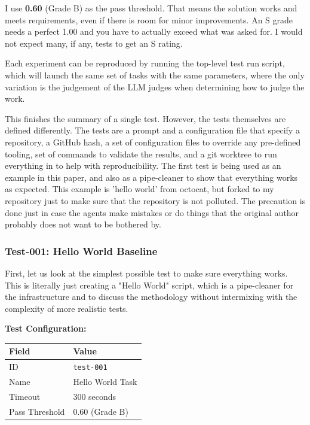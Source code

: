 \documentclass[11pt]{article}
\begin{document}
I use \textbf{0.60} (Grade B) as the pass threshold. That means the solution works
and meets requirements, even if there is room for minor improvements. An S grade
needs a perfect 1.00 and you have to actually exceed what was asked for. I would
not expect many, if any, tests to get an S rating.

Each experiment can be reproduced by running the top-level test run script,
which will launch the same set of tasks with the same parameters, where the only
variation is the judgement of the LLM judges when determining how to judge the
work.

This finishes the summary of a single test. However, the tests themselves are
defined differently. The tests are a prompt and a configuration file that specify
a repository, a GitHub hash, a set of configuration files to override any
pre-defined tooling, set of commands to validate the results, and a git worktree to
run everything in to help with reproducibility. The first test is being used as
an example in this paper, and also as a pipe-cleaner to show that everything
works as expected. This example is 'hello world' from octocat, but forked to my
repository just to make sure that the repository is not polluted. The precaution
is done just in case the agents make mistakes or do things that the original
author probably does not want to be bothered by.

\subsubsection{Test-001: Hello World Baseline}

First, let us look at the simplest possible test to make sure everything works.
This is literally just creating a "Hello World" script, which is a pipe-cleaner
for the infrastructure and to discuss the methodology without intermixing with
the complexity of more realistic tests.

\begin{center}
\textbf{Test Configuration:}

\begin{tabular}{ll}
\toprule
Field & Value \\
\midrule
ID & \texttt{test-001} \\
Name & Hello World Task \\
Timeout & 300 seconds \\
Pass Threshold & 0.60 (Grade B) \\
\bottomrule
\end{tabular}
\end{center}
\end{document}
